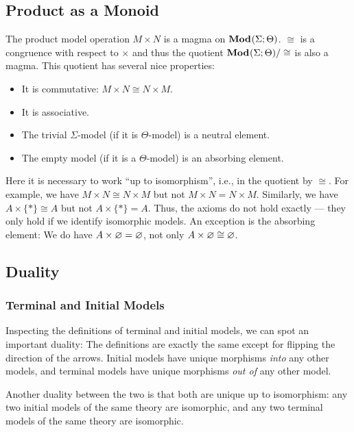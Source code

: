 \subsection{Product as a Monoid}

The product model operation $M\times N$ is a magma on ${\mathbf{Mod}^{}}(\Sigma;\Theta)$.
$\cong$ is a congruence with respect to $\times$ and thus the quotient ${\mathbf{Mod}^{}}(\Sigma;\Theta)/\cong$ is also a magma.
This quotient has several nice properties:
\begin{itemize}
 \item It is commutative: $M\times N\cong N\times M$.
 \item It is associative.
 \item The trivial $\Sigma$-model (if it is $\Theta$-model) is a neutral element.
 \item The empty model (if it is a $\Theta$-model) is an absorbing element.
\end{itemize}

Here it is necessary to work ``up to isomorphism'', i.e., in the quotient by $\cong$.
For example, we have $M\times N \cong N\times M$ but not $M\times N=N\times M$.
Similarly, we have $A\times \{\ast\}\cong A$ but not $A\times \{\ast\}=A$.
Thus, the axioms do not hold exactly --- they only hold if we identify isomorphic models.
An exception is the absorbing element: We do have $A\times \varnothing=\varnothing$, not only $A\times \varnothing\cong \varnothing$.

\subsection{Duality}\label{sec:univ:meta:dual}

\subsubsection{Terminal and Initial Models}\label{sec:univ:meta:terminit}

Inspecting the definitions of terminal and initial models, we can spot an important duality:
The definitions are exactly the same except for flipping the direction of the arrows.
Initial models have unique morphisms \emph{into} any other models, and terminal models have unique morphisms \emph{out of} any other model.

Another duality between the two is that both are unique up to isomorphism: any two initial models of the same theory are isomorphic, and any two terminal models of the same theory are isomorphic.

